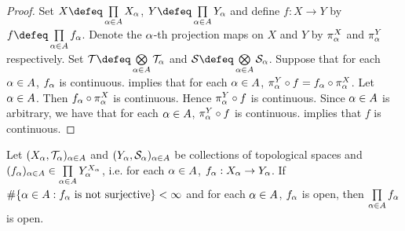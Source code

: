 \documentclass{book}
\begin{document}
	\begin{proof}
		Set $X \defeq \prod\limits_{\al \in A} X_{\al}$, $Y \defeq \prod\limits_{\al \in A}Y_{\al}$ and define $f: X \rightarrow Y$ by $f \defeq \prod\limits_{\al \in A} f_{\al}$. Denote the $\alpha$-th projection maps on $X$ and $Y$ by $\pi^X_{\alpha}$ and $\pi^Y_{\alpha}$ respectively. Set $\MT \defeq \bigotimes\limits_{\al \in A}\MT_{\al}$ and $\MS \defeq \bigotimes\limits_{\al \in A} \MS_{\al}$. Suppose that for each $\alpha \in A$, $f_{\alpha}$ is continuous.  implies that for each $\alpha \in A$, $\pi^Y_{\alpha} \circ f = f_{\alpha} \circ \pi^X_{\alpha}$. Let $\alpha \in A$. Then $f_{\alpha} \circ \pi^X_{\alpha}$ is continuous. Hence $\pi^Y_{\alpha} \circ f$ is continuous. Since $\alpha \in A$ is arbitrary, we have that for each $\alpha \in A$, $\pi^Y_{\alpha} \circ f$ is continuous.  implies that $f$ is continuous. 
	\end{proof}

	\begin{ex} 
		Let $(X_{\alpha}, \mathcal{T}_{\alpha})_{\alpha \in A}$ and $(Y_{\alpha}, \mathcal{S}_{\alpha})_{\alpha \in A}$ be collections of topological spaces and $(f_{\alpha})_{\alpha \in A} \in \prod\limits_{\alpha \in A} Y_{\alpha}^{X_{\alpha}}$, i.e. for each $\alpha \in A$, $f_{\alpha}:X_{\alpha} \rightarrow Y_{\alpha}$. If $\# \{\alpha \in A: f_{\alpha} \text{ is not surjective}\} < \infty$ and for each $\alpha \in A$, $f_{\alpha}$ is open, then $\prod\limits_{\alpha \in A} f_{\alpha}$ is open.
	\end{ex}
\end{document}
